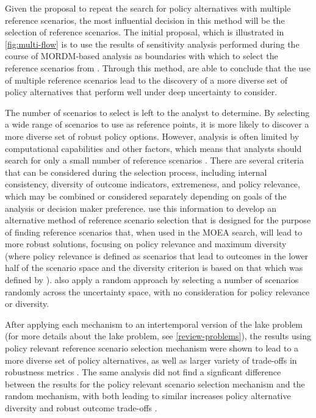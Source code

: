     Given the proposal to repeat the search for policy alternatives with multiple reference scenarios, the most influential decision in this method will be the selection of reference scenarios. The initial proposal, which is illustrated in \cref{fig:multi-flow} is to use the results of sensitivity analysis performed during the course of MORDM-based analysis as boundaries with which to select the reference scenarios from \citep{Watson2017}. Through this method, \citet{Watson2017} are able to conclude that the use of multiple reference scenarios lead to the discovery of a more diverse set of policy alternatives that perform well under deep uncertainty to consider.
    
    The number of scenarios to select is left to the analyst to determine. By selecting a wide range of scenarios to use as reference points, it is more likely to discover a more diverse set of robust policy options. However, analysis is often limited by computational capabilities and other factors, which means that analysts should search for only a small number of reference scenarios \citep{Eker2018}. There are several criteria that can be considered during the selection process, including internal consistency, diversity of outcome indicators, extremeness, and policy relevance, which may be combined or considered separately depending on goals of the analysis or decision maker preference. \citet{Eker2018} use this information to develop an alternative method of reference scenario selection that is designed for the purpose of finding reference scenarios that, when used in the MOEA search, will lead to more robust solutions, focusing on policy relevance and maximum diversity (where policy relevance is defined as scenarios that lead to outcomes in the lower half of the scenario space and the diversity criterion is based on that which was defined by \citet{Carlsen2016}). \citet{Eker2018} also apply a random approach by selecting a number of scenarios randomly across the uncertainty space, with no consideration for policy relevance or diversity. 

    After applying each mechanism to an intertemporal version of the lake problem (for more details about the lake problem, see \cref{review-problems}), the results using policy relevant reference scenario selection mechanism were shown to lead to a more diverse set of policy alternatives, as well as larger variety of trade-offs in robustness metrics \citep{Eker2018}. The same analysis did not find a signficant difference between the results for the policy relevant scenario selection mechanism and the random mechanism, with both leading to similar increases policy alternative diversity and robust outcome trade-offs \citep{Eker2018}. 
    
